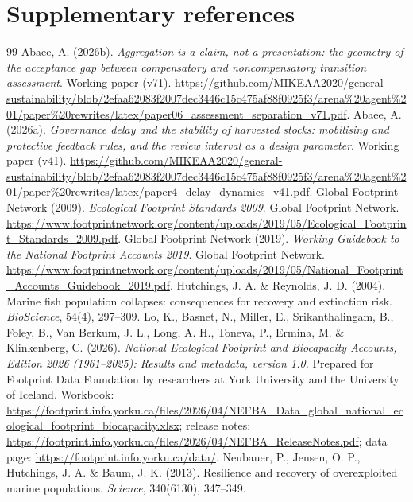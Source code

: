 \documentclass[11pt,a4paper]{article}
\begin{document}
\section*{Supplementary references}
\begin{thebibliography}{99}
\small
{} Abaee, A. (2026b). \emph{Aggregation is a claim, not a presentation: the geometry of the acceptance gap between compensatory and noncompensatory transition assessment}. Working paper (v71). \url{https://github.com/MIKEAA2020/general-sustainability/blob/2efaa62083f2007dec3446c15c475af88f0925f3/arena%20agent%201/paper%20rewrites/latex/paper06_assessment_separation_v71.pdf}.
 Abaee, A. (2026a). \emph{Governance delay and the stability of harvested stocks: mobilising and protective feedback rules, and the review interval as a design parameter}. Working paper (v41). \url{https://github.com/MIKEAA2020/general-sustainability/blob/2efaa62083f2007dec3446c15c475af88f0925f3/arena%20agent%201/paper%20rewrites/latex/paper4_delay_dynamics_v41.pdf}.
 Global Footprint Network (2009). \emph{Ecological Footprint Standards 2009}. Global Footprint Network. \url{https://www.footprintnetwork.org/content/uploads/2019/05/Ecological_Footprint_Standards_2009.pdf}.
 Global Footprint Network (2019). \emph{Working Guidebook to the National Footprint Accounts 2019}. Global Footprint Network. \url{https://www.footprintnetwork.org/content/uploads/2019/05/National_Footprint_Accounts_Guidebook_2019.pdf}.
 Hutchings, J. A. \& Reynolds, J. D. (2004). Marine fish population collapses: consequences for recovery and extinction risk. \emph{BioScience}, 54(4), 297--309.
 Lo, K., Basnet, N., Miller, E., Srikanthalingam, B., Foley, B., Van Berkum, J. L., Long, A. H., Toneva, P., Ermina, M. \& Klinkenberg, C. (2026). \emph{National Ecological Footprint and Biocapacity Accounts, Edition 2026 (1961--2025): Results and metadata, version 1.0.} Prepared for Footprint Data Foundation by researchers at York University and the University of Iceland. Workbook: \url{https://footprint.info.yorku.ca/files/2026/04/NEFBA_Data_global_national_ecological_footprint_biocapacity.xlsx}; release notes: \url{https://footprint.info.yorku.ca/files/2026/04/NEFBA_ReleaseNotes.pdf}; data page: \url{https://footprint.info.yorku.ca/data/}.
 Neubauer, P., Jensen, O. P., Hutchings, J. A. \& Baum, J. K. (2013). Resilience and recovery of overexploited marine populations. \emph{Science}, 340(6130), 347--349.

\end{thebibliography}
\end{document}
